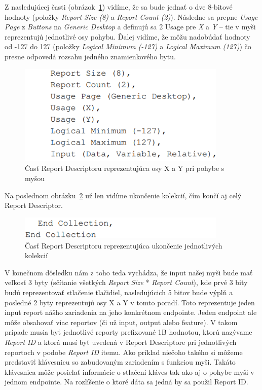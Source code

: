 Z nasledujúcej časti (obrázok~\ref{obr:kap3:report_desc_axis}) vidíme, že sa bude jednať o dve 8-bitové hodnoty (položky \textit{Report Size (8)} a \textit{Report Count (2)}). Následne sa prepne \textit{Usage Page} z \textit{Buttons} na \textit{Generic Desktop} a definujú sa 2 Usage pre \textit{X} a \textit{Y} -- tie v myši reprezentujú jednotlivé osy pohybu. Ďalej vidíme, že môžu nadobúdať hodnoty od -127 do 127 (položky \textit{Logical Minimum (-127)} a \textit{Logical Maximum (127)}) čo presne odpovedá rozsahu jedného znamienkového bytu.

\begin{figure}[!htb]
	\centering
	\includegraphics[width=10cm]{img/kap03_report_desc_axis}
	\caption{Časť Report Descriptoru reprezentujúca osy X a Y pri pohybe s myšou}
	\label{obr:kap3:report_desc_axis}
\end{figure}

Na poslednom obrázku~\ref{obr:kap3:report_desc_end} už len vidíme ukončenie kolekcií, čím končí aj celý Report Descriptor.

\begin{figure}[!htb]
	\centering
	\includegraphics[width=10cm]{img/kap03_report_desc_end}
	\caption{Časť Report Descriptoru reprezentujúca ukončenie jednotlivých kolekcií}
	\label{obr:kap3:report_desc_end}
\end{figure}

V konečnom dôsledku nám z toho teda vychádza, že input našej myši bude mať veľkosť 3 byty (sčítanie všetkých \textit{Report Size} * \textit{Report Count}), kde prvé 3 bity budú reprezentovať stlačenie tlačidiel, nasledujúcich 5 bitov bude výplň a posledné 2 byty reprezentujú osy X a Y v tomto poradí. Toto reprezentuje jeden input report nášho zariadenia na jeho konkrétnom endpointe. Jeden endpoint ale môže obsahovať viac reportov (či už input, output alebo feature). V takom prípade musia byť jednotlivé reporty prefixované 1B hodnotou, ktorú nazývame \textit{Report ID} a ktorá musí byť uvedená v Report Descriptore pri jednotlivých reportoch v podobe \textit{Report ID} itemu. Ako príklad niečoho takého si môžeme predstaviť klávesnicu so zabudovaným zariadením s funkciou myši. Takáto klávesnica môže posielať informácie o stlačení kláves tak ako aj o pohybe myši v jednom endpointe. Na rozlíšenie o ktoré dáta sa jedná by sa použil Report ID.

